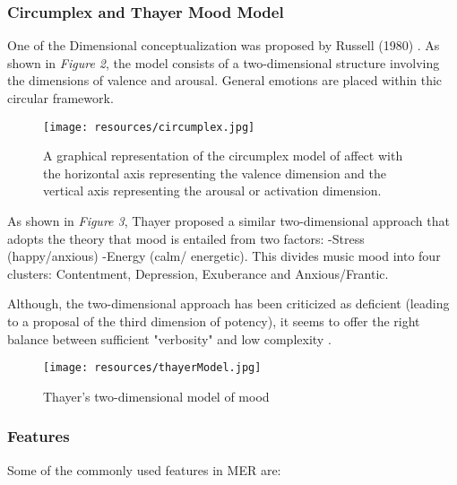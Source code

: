 \subsubsection{Circumplex and Thayer Mood Model}

One of the Dimensional conceptualization was proposed by Russell (1980) \cite{Russell1980}.
As shown in \textit{Figure 2}, the model consists of a two-dimensional structure involving the dimensions of valence and arousal. 
General emotions are placed within thic circular framework.

\begin{figure}[hlvt!]
        \centering
        \texttt{[image: resources/circumplex.jpg]}
        \caption{A graphical representation of the circumplex model of affect with the horizontal axis representing the valence dimension and the vertical axis representing the arousal or activation dimension.}
        \label{fig:figure2}
\end{figure}

As shown in \textit{Figure 3}, Thayer \cite{Thayer1990} proposed a similar two-dimensional approach that adopts the theory that mood is entailed from two factors: -Stress (happy/anxious) -Energy (calm/ energetic). 
This divides music mood into four clusters: Contentment, Depression, Exuberance and Anxious/Frantic.

Although, the two-dimensional approach has been criticized as deficient (leading to a proposal of the third dimension of potency), it seems to offer the right balance between sufficient "verbosity" and low complexity \cite{Juslin2001}.

\begin{figure}[hlvt!]
        \centering
        \texttt{[image: resources/thayerModel.jpg]}
        \caption{Thayer's two-dimensional model of mood}
        \label{fig:figure3}
\end{figure}

\subsubsection{Features}

Some of the commonly used features in MER are:

